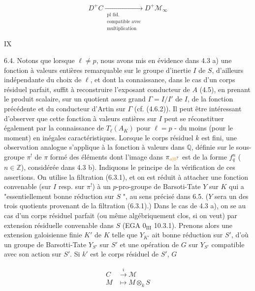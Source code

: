 \[
D^+C\xrightarrow[\substack{\text{pl fid.}\\\text{compatible avec}\\\text{multiplication}}]{}D^+\mathcal M_\infty
\]

\hfill IX

6.4. Notons que lorsque $\ell\ne p$, nous avons mis en évidence dans 4.3 a) une fonction à valeurs entières remarquable sur le groupe d'inertie $I$ de $S$, d'ailleurs indépendante du choix de $\ell$, et dont la connaissance, dans le cas d'un corps résiduel parfait, suffit à reconstruire l'exposant conducteur de $A$ (4.5), en prenant le produit scalaire, sur un quotient assez grand $\Gamma=I/I'$ de $I$, de la fonction précédente et du conducteur d'Artin sur $\Gamma$ (cf. (4.6.2)). Il peut être intéressant d'observer que cette fonction à valeurs entières sur $I$ peut se réconstituer également par la connaissance de $T_\ell(A_K)$ pour $\ell=p$ - du moins (pour le moment) en inégales caractéristiques. Lorsque le corps résiduel $k$ est fini, une observation analogue s'applique à la fonction à valeurs dans $\mathbb Q$, définie sur le sous-groupe $\pi^!$ de $\pi$ formé des éléments dont l'image dans $\pi_{\unsure{o|0}}$ est de la forme $f_q^n$ ($n\in\mathbb Z$), considérée dans 4.3 b). Indiquons le principe de la vérification de ces assertions. On utilise la filtration (6.3.1), et on est réduit à attacher une fonction convenable (sur $I$ resp. sur $\pi^!$) à un $p$-pro-groupe de Barsoti-Tate $Y$ sur $K$ qui a "essentiellement bonne réduction sur $S$ ", au sens précisé dans 6.5. ($Y$ sera un des trois quotients provenant de la filtration (6.3.1).) Dans le cas de 4.3 a), on se  au cas d'un corps résiduel parfait (ou même algébriquement clos, si on veut) par extension résiduelle convenable dans $S$ (EGA $0_{\mathrm{III}}$ 10.3.1). Prenons alors une extension galoisienne finie $K'$ de $K$ telle que $Y_{K'}$ ait bonne réduction sur $S'$, d'où un groupe de Barsotti-Tate $Y_{S'}$ sur $S'$ et une opération de $G$ sur $Y_{S'}$ compatible avec son action sur $S'$. Si $k'$ est le corps résiduel de $S'$, $G$

\[
\begin{aligned} C&\xrightarrow{i}\mathcal M\\ M&\longmapsto M\otimes_k S\end{aligned}
\]

